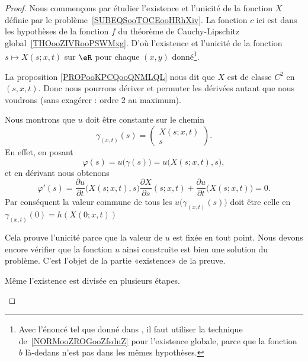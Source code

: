 \begin{proof}
	Nous commençons par étudier l'existence et l'unicité de la fonction \( X\) définie par le problème~\ref{SUBEQSooTOCEooHRhXiv}. La fonction \( c\) ici est dans les hypothèses de la fonction \( f\) du théorème de Cauchy-Lipschitz global~\ref{THOooZIVRooPSWMxg}. D'où l'existence et l'unicité de la fonction \( s\mapsto X(s;x,t)\) sur \( \eR\) pour chaque \( (x,y)\) donné\footnote{Avec l'énoncé tel que donné dans \cite{ooAUICooVUjyqo}, il faut utiliser la technique de~\ref{NORMooZROGooZfsdnZ} pour l'existence globale, parce que la fonction \( b\) là-dedans n'est pas dans les mêmes hypothèses.}.

	La proposition \ref{PROPooKPCQooQNMLQL} nous dit que \( X\) est de classe \( C^2\) en \( (s,x,t)\). Donc nous pourrons dériver et permuter les dérivées autant que nous voudrons (sans exagérer : ordre \( 2\) au maximum).

	\begin{subproof}
		\spitem[Unicité]
		Nous montrons que \( u\) doit être constante sur le chemin
		\begin{equation}
			\gamma_{(x,t)}(s)=\begin{pmatrix}
				X(s;x,t) \\
				s
			\end{pmatrix}.
		\end{equation}
		En effet, en posant
		\begin{equation}
			\varphi(s)=u\big( \gamma(s) \big)=u\big( X(s;x,t),s \big),
		\end{equation}
		et en dérivant nous obtenons
		\begin{equation}
			\varphi'(s)=\frac{ \partial u }{ \partial t }\big( X(s;x,t),s \big)\frac{ \partial X }{ \partial s }(s;x,t)+\frac{ \partial u }{ \partial t }\big( X(s;x,t) \big)=0.
		\end{equation}
		Par conséquent la valeur commune de tous les \(   u\big( \gamma_{(x,t)}(s) \big)    \) doit être celle en \( \gamma_{(x,t)}(0)=h(  X(0;x,t)  ) \)

		Cela prouve l'unicité parce que la valeur de \( u\) est fixée en tout point. Nous devons encore vérifier que la fonction \( u\) ainsi construite est bien une solution du problème. C'est l'objet de la partie «existence» de la preuve.

		\spitem[Existence]

		Même l'existence est divisée en plusieurs étapes.

		\begin{subproof}


\end{subproof}
\end{subproof}
\end{proof}
